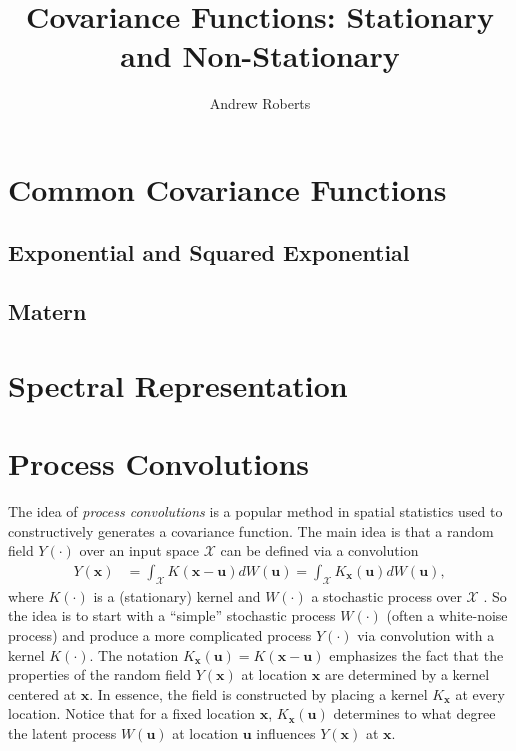 \documentclass[12pt]{article}
\title{Covariance Functions: Stationary and Non-Stationary}
\author{Andrew Roberts}
\newcommand{\Ker}{K}
\newcommand{\locSpace}{\mathcal{X}}
\newcommand{\loc}{\mathbf{x}}
\newcommand{\locDum}{\mathbf{u}}
\newcommand{\rf}{Y}
\begin{document}
\maketitle
\tableofcontents
\newpage


\section{Common Covariance Functions}

\subsection{Exponential and Squared Exponential}

\subsection{Matern}


\section{Spectral Representation}

\section{Process Convolutions}
The idea of \textit{process convolutions} is a popular method in spatial statistics used to constructively generates a covariance function. The main idea is that a random field $\rf(\cdot)$ over an input space 
$\locSpace$ can be defined via a convolution 
\begin{align}
\rf(\loc) &= \int_{\locSpace} \Ker(\loc - \locDum) dW(\locDum) =  \int_{\locSpace} \Ker_{\loc}(\locDum) dW(\locDum), \label{process_convolution}
\end{align}
where $\Ker(\cdot)$ is a (stationary) kernel and $W(\cdot)$ a stochastic process over $\locSpace$ \cite{Risser}. So the idea is to start with a ``simple'' stochastic process $W(\cdot)$ (often a white-noise process) and produce a 
more complicated process $\rf(\cdot)$ via convolution with a kernel $\Ker(\cdot)$. The notation $\Ker_{\loc}(\locDum) = \Ker(\loc - \locDum)$ emphasizes the fact that the properties of the random field $\rf(\loc)$ at location 
$\loc$ are determined by a kernel centered at $\loc$. In essence, the field is constructed by placing a kernel $\Ker_{\loc}$ at every location. Notice that for a fixed location $\loc$, $\Ker_{\loc}(\locDum)$ determines to what degree
the latent process $W(\locDum)$ at location $\locDum$ influences $\rf(\loc)$ at $\loc$. 
\end{document}
